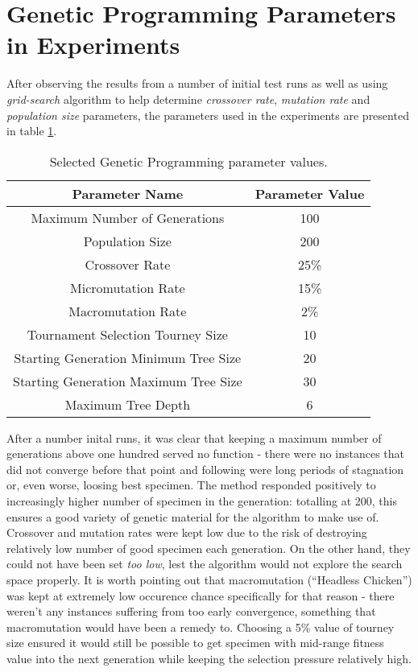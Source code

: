 \section{Genetic Programming Parameters in Experiments}
After observing the results from a number of initial test runs as well as using \textit{grid-search} algorithm to help determine \textit{crossover rate}, \textit{mutation rate} and \textit{population size} parameters, the parameters used in the experiments are presented in table \ref{table:x selectedgpparameters}.

\begin{table} [h]
    \centering
    \begin{tabular} {c c}
        \hline \hline
        Parameter Name & Parameter Value \\
        \hline
        Maximum Number of Generations & 100 \\
        Population Size & 200 \\
        Crossover Rate & 25\% \\
        Micromutation Rate & 15\% \\
        Macromutation Rate & 2\% \\
        Tournament Selection Tourney Size & 10 \\
        Starting Generation Minimum Tree Size & 20 \\
        Starting Generation Maximum Tree Size & 30 \\
        Maximum Tree Depth & 6 \\
    \end{tabular}
    \caption{Selected Genetic Programming parameter values.}
    \label{table:x selectedgpparameters}
\end{table}

After a number inital runs, it was clear that keeping a maximum number of generations above one hundred served no function - there were no instances that did not converge before that point and following were long periods of stagnation or, even worse, loosing best specimen. The method responded positively to increasingly higher number of specimen in the generation: totalling at 200, this ensures a good variety of genetic material for the algorithm to make use of. Crossover and mutation rates were kept low due to the risk of destroying relatively low number of good specimen each generation. On the other hand, they could not have been set \textit{too low}, lest the algorithm would not explore the search space properly. It is worth pointing out that macromutation (``Headless Chicken'') was kept at extremely low occurence chance specifically for that reason - there weren't any instances suffering from too early convergence, something that macromutation would have been a remedy to. Choosing a 5\% value of tourney size ensured it would still be possible to get specimen with mid-range fitness value into the next generation while keeping the selection pressure relatively high.

